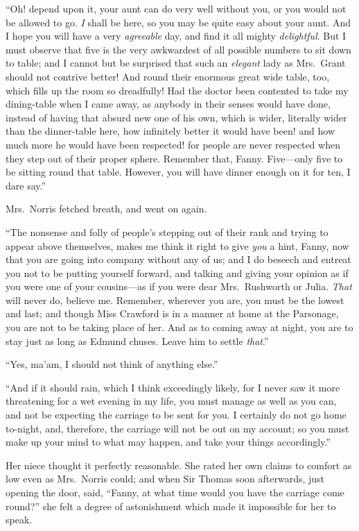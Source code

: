 ``Oh! depend upon it, your aunt can do very well without you,
or you would not be allowed to go.  \emph{I} shall be here, so you
may be quite easy about your aunt.  And I hope you will have
a very \emph{agreeable} day, and find it all mighty \emph{delightful}.
But I must observe that five is the very awkwardest of
all possible numbers to sit down to table; and I cannot
but be surprised that such an \emph{elegant} lady as Mrs.\ Grant
should not contrive better!  And round their enormous great
wide table, too, which fills up the room so dreadfully!
Had the doctor been contented to take my dining-table when I
came away, as anybody in their senses would have done,
instead of having that absurd new one of his own,
which is wider, literally wider than the dinner-table here,
how infinitely better it would have been! and how much
more he would have been respected! for people are never
respected when they step out of their proper sphere.
Remember that, Fanny.  Five---only five to be sitting
round that table.  However, you will have dinner enough
on it for ten, I dare say.''

Mrs.\ Norris fetched breath, and went on again.

``The nonsense and folly of people's stepping out of their
rank and trying to appear above themselves, makes me
think it right to give \emph{you} a hint, Fanny, now that you
are going into company without any of us; and I do beseech
and entreat you not to be putting yourself forward,
and talking and giving your opinion as if you were one of
your cousins---as if you were dear Mrs.\ Rushworth or Julia.
\emph{That} will never do, believe me.  Remember, wherever you are,
you must be the lowest and last; and though Miss Crawford
is in a manner at home at the Parsonage, you are not to
be taking place of her.  And as to coming away at night,
you are to stay just as long as Edmund chuses.
Leave him to settle \emph{that}.''

``Yes, ma'am, I should not think of anything else.''

``And if it should rain, which I think exceedingly likely,
for I never saw it more threatening for a wet evening
in my life, you must manage as well as you can, and not be
expecting the carriage to be sent for you.  I certainly
do not go home to-night, and, therefore, the carriage will
not be out on my account; so you must make up your mind
to what may happen, and take your things accordingly.''

Her niece thought it perfectly reasonable.  She rated her
own claims to comfort as low even as Mrs.\ Norris could;
and when Sir Thomas soon afterwards, just opening
the door, said, ``Fanny, at what time would you have the
carriage come round?'' she felt a degree of astonishment
which made it impossible for her to speak.

